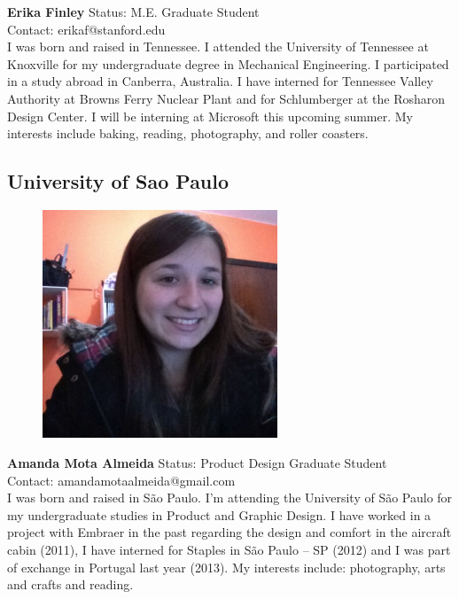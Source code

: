 \documentclass[a4paper, 12pt,conference]{new_cit_thesis}
\begin{document}
\textbf{Erika Finley}
Status: M.E. Graduate Student \\
Contact: erikaf@stanford.edu \\
I was born and raised in Tennessee. I attended the University of Tennessee at Knoxville for my undergraduate degree in Mechanical Engineering.  I participated in a study abroad in Canberra, Australia.  I have interned for Tennessee Valley Authority at Browns Ferry Nuclear Plant and for Schlumberger at the Rosharon Design Center. I will be interning at Microsoft this upcoming summer. My interests include baking, reading, photography, and roller coasters.  

\subsection*{University of Sao Paulo}

\begin{figure}[h]
  \centering
     \includegraphics[width=7cm]{images/image013}
  \label{fig:13}
\end{figure}

\textbf{Amanda Mota Almeida}
Status: Product Design Graduate Student \\
Contact: amandamotaalmeida@gmail.com \\
I was born and raised in São Paulo. I’m attending the University of São Paulo for my undergraduate studies in Product and Graphic Design. I have worked in a project with Embraer in the past regarding the design and comfort in the aircraft cabin (2011), I have interned for Staples in São Paulo – SP (2012) and I was part of exchange in Portugal last year (2013). My interests include: photography, arts and crafts and reading.
\end{document}
